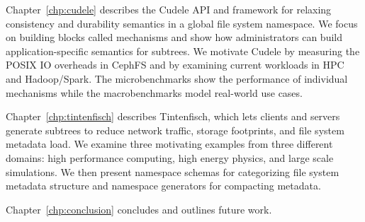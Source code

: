 Chapter~\ref{chp:cudele} describes the Cudele API and framework for relaxing
consistency and durability semantics in a global file system namespace. We
focus on building blocks called mechanisms and show how administrators can
build application-specific semantics for subtrees.  We motivate Cudele by
measuring the POSIX IO overheads in CephFS and by examining current workloads
in HPC and Hadoop/Spark. The microbenchmarks show the performance of individual
mechanisms while the macrobenchmarks model real-world use cases.

Chapter~\ref{chp:tintenfisch} describes Tintenfisch, which lets clients and
servers generate subtrees to reduce network traffic, storage footprints, and
file system metadata load. We examine three motivating examples from three
different domains: high performance computing, high energy physics, and large
scale simulations. We then present namespace schemas for categorizing file
system metadata structure and namespace generators for compacting metadata.

Chapter~\ref{chp:conclusion} concludes and outlines future work.

